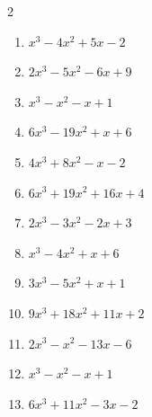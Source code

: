 \begin{multicols}{2}
\begin{enumerate}
        \phantom{$=(3x-2)(x+1)(x+3)$}

\columnbreak %

  \item $x^{3}-4x^{2}+5x-2$


  \item $2x^{3}-5x^{2}-6x+9$

        \phantom{$=(2x+3)(x-1)(x-3)$}

  \item $x^{3}-x^{2}-x+1$


  \item $6x^{3}-19x^{2}+x+6$

        \phantom{$=(2x+1)(3x-2)(x-3)$}

  \item $4x^{3}+8x^{2}-x-2$

        \phantom{$=(2x+1)(2x-1)(x+2)$}

\columnbreak %

\resetques

  \item $6x^{3}+19x^{2}+16x+4$

        \phantom{$=(2x+1)(3x+2)(x+2)$}

  \item $2x^{3}-3x^{2}-2x+3$

        \phantom{$=(2x-3)(x+1)(x-1)$}

  \item $x^{3}-4x^{2}+x+6$

        \phantom{$=(x+1)(x-2)(x-3)$}

  \item $3x^{3}-5x^{2}+x+1$


  \item $9x^{3}+18x^{2}+11x+2$

        \phantom{$=(3x+1)(3x+2)(x+1)$}

\columnbreak %

  \item $2x^{3}-x^{2}-13x-6$

        \phantom{$=(2x+1)(x+2)(x-3)$}

  \item $x^{3}-x^{2}-x+1$


  \item $6x^{3}+11x^{2}-3x-2$


\end{enumerate}
\end{multicols}
